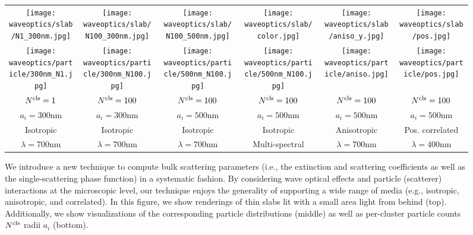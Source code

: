 \begin{figure}[!ht]
    \centering
    \setlength{\resLen}{1.02in}
    \addtolength{\tabcolsep}{-4pt}
    \small
    \begin{tabular}{cccccc}
        \texttt{[image: waveoptics/slab/N1\_300nm.jpg]} &
        \texttt{[image: waveoptics/slab/N100\_300nm.jpg]} &
        \texttt{[image: waveoptics/slab/N100\_500nm.jpg]} &
        \texttt{[image: waveoptics/slab/color.jpg]} & 
        \texttt{[image: waveoptics/slab/aniso\_y.jpg]} &
        \texttt{[image: waveoptics/slab/pos.jpg]}
        \\
        \texttt{[image: waveoptics/particle/300nm\_N1.jpg]} &
        \texttt{[image: waveoptics/particle/300nm\_N100.jpg]} &
        \texttt{[image: waveoptics/particle/500nm\_N100.jpg]} &
        \texttt{[image: waveoptics/particle/500nm\_N100.jpg]} &
        \texttt{[image: waveoptics/particle/aniso.jpg]} &
        \texttt{[image: waveoptics/particle/pos.jpg]}
        \\
        $N^\mathrm{cls}=1$   &
        $N^\mathrm{cls}=100$ &
        $N^\mathrm{cls}=100$ &
        $N^\mathrm{cls}=100$ & 
        $N^\mathrm{cls}=100$ &
        $N^\mathrm{cls}=100$
        \\
        $a_i=300\text{nm}$ &
		$a_i=300\text{nm}$ &
		$a_i=500\text{nm}$ &
		$a_i=500\text{nm}$ & 
		$a_i=500\text{nm}$ &
		$a_i=500\text{nm}$
		\\
        Isotropic & Isotropic & Isotropic & Isotropic & Anisotropic & Pos. correlated
        \\
        $\lambda=700\text{nm}$ &
        $\lambda=700\text{nm}$ &
        $\lambda=700\text{nm}$ &
        Multi-spectral &
        $\lambda=700\text{nm}$ &
        $\lambda=400\text{nm}$
    \end{tabular}
    \caption[Teaser]{\label{fig:waveoptics:teaser}
        We introduce a new technique to compute bulk scattering parameters (i.e., the extinction and scattering coefficients as well as the single-scattering phase function) in a systematic fashion. By considering wave optical effects and particle (scatterer) interactions at the microscopic level, our technique enjoys the generality of supporting a wide range of media (e.g., isotropic, anisotropic, and correlated).
        In this figure, we show renderings of thin slabs lit with a small area light from behind (top).
        Additionally, we show visualizations of the corresponding particle distributions (middle) as well as per-cluster particle counts~$N^\mathrm{cls}$ radii $a_i$ (bottom).
    }
\end{figure}
